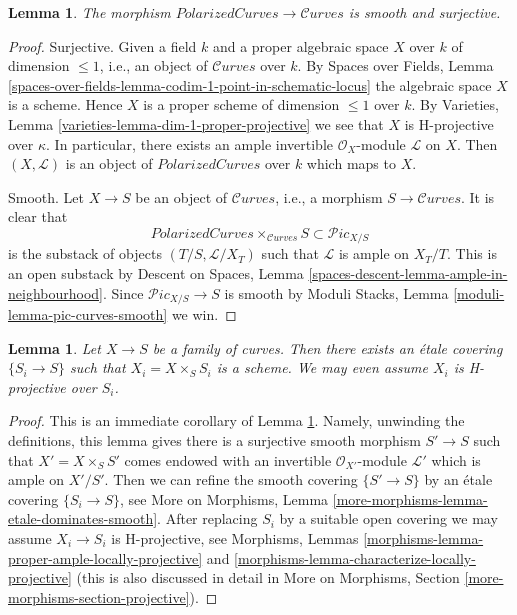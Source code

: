 \documentclass{stacks-project}
\theoremstyle{plain}
\newtheorem{lemma}[subsection]{Lemma}
\theoremstyle{definition}
\theoremstyle{remark}
\numberwithin{equation}{subsection}
\def\Curvesstack{\mathcal{C}\!\mathit{urves}}
\def\Picardstack{\mathcal{P}\!\mathit{ic}}
\begin{document}
\begin{lemma}
\label{lemma-polarized-curves-over-curves}
The morphism
$\textit{PolarizedCurves} \to \Curvesstack$
is smooth and surjective.
\end{lemma}

\begin{proof}
Surjective. Given a field $k$ and a proper algebraic space
$X$ over $k$ of dimension $\leq 1$, i.e., an object of $\Curvesstack$ over $k$.
By Spaces over Fields, Lemma
\ref{spaces-over-fields-lemma-codim-1-point-in-schematic-locus}
the algebraic space $X$ is a scheme. Hence $X$
is a proper scheme of dimension $\leq 1$ over $k$.
By Varieties, Lemma \ref{varieties-lemma-dim-1-proper-projective}
we see that $X$ is H-projective over $\kappa$.
In particular, there exists an ample invertible $\mathcal{O}_X$-module
$\mathcal{L}$ on $X$. Then $(X, \mathcal{L})$ is an object
of $\textit{PolarizedCurves}$ over
$k$ which maps to $X$.

\medskip\noindent
Smooth. Let $X \to S$ be an object of $\Curvesstack$, i.e., a
morphism $S \to \Curvesstack$. It is clear that
$$
\textit{PolarizedCurves}
\times_{\Curvesstack} S
\subset \Picardstack_{X/S}
$$
is the substack of objects $(T/S, \mathcal{L}/X_T)$ such that
$\mathcal{L}$ is ample on $X_T/T$. This is an open substack by
Descent on Spaces, Lemma \ref{spaces-descent-lemma-ample-in-neighbourhood}.
Since $\Picardstack_{X/S} \to S$ is smooth by
Moduli Stacks, Lemma \ref{moduli-lemma-pic-curves-smooth}
we win.
\end{proof}

\begin{lemma}
\label{lemma-etale-locally-scheme}
Let $X \to S$ be a family of curves.
Then there exists an \'etale covering $\{S_i \to S\}$
such that $X_i = X \times_S S_i$ is a scheme. We may even
assume $X_i$ is H-projective over $S_i$.
\end{lemma}

\begin{proof}
This is an immediate corollary of
Lemma \ref{lemma-polarized-curves-over-curves}.
Namely, unwinding the definitions, this lemma gives there is a
surjective smooth morphism $S' \to S$ such that $X' = X \times_S S'$
comes endowed with an invertible $\mathcal{O}_{X'}$-module
$\mathcal{L}'$ which is ample on $X'/S'$.
Then we can refine the smooth covering $\{S' \to S\}$
by an \'etale covering $\{S_i \to S\}$, see
More on Morphisms, Lemma \ref{more-morphisms-lemma-etale-dominates-smooth}.
After replacing $S_i$ by a suitable open covering we may assume
$X_i \to S_i$ is H-projective, see
Morphisms, Lemmas \ref{morphisms-lemma-proper-ample-locally-projective} and
\ref{morphisms-lemma-characterize-locally-projective}
(this is also discussed in detail in
More on Morphisms, Section \ref{more-morphisms-section-projective}).
\end{proof}
\end{document}
